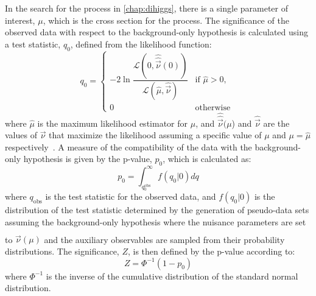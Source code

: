 In the search for the \ppXHHYggtt process in \cref{chap:dihiggs}, there is a single parameter of interest, $\mu$, which is the cross section for the process. The significance of the observed data with respect to the background-only hypothesis is calculated using a test statistic, $q_0$, defined from the likelihood function:
\begin{equation}
  q_0 = \begin{cases}
    -2 \ln \dfrac{\mathcal{L}(0, \hat{\hat{\vec{\nu}}}(0))}{\mathcal{L}(\hat{\mu}, \hat{\vec{\nu}})}  & \text{if } \hat{\mu} > 0, \\
    0 & \text{otherwise }
  \end{cases}
\end{equation}
where $\hat{\mu}$ is the maximum likelihood estimator for $\mu$, and $\hat{\hat{\vec{\nu}}}(\mu$) and $\hat{\vec{\nu}}$ are the values of $\vec{\nu}$ that maximize the likelihood assuming a specific value of $\mu$ and $\mu=\hat{\mu}$ respectively~\cite{Cowan:2010js}. A measure of the compatibility of the data with the background-only hypothesis is given by the p-value, $p_0$, which is calculated as:
\begin{equation}
  p_0 = \int_{q_0^{\text{obs}}}^\infty f(q_0 | 0) dq
\end{equation}
where $q_{\text{obs}}$ is the test statistic for the observed data, and $f(q_0|0)$ is the distribution of the test statistic determined by the generation of pseudo-data sets assuming the background-only hypothesis where the nuisance parameters are set to $\hat{\hat{\vec{\nu}}}(\mu)$ and the auxiliary observables are sampled from their probability distributions. The significance, $Z$, is then defined by the p-value according to:
\begin{equation}
  Z = \Phi^{-1}(1 - p_0)
\end{equation}
where $\Phi^{-1}$ is the inverse of the cumulative distribution of the standard normal distribution.

\newpage

